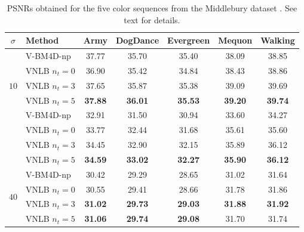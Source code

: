 \documentclass{llncs}
\newcommand{\best}[1]{\textbf{#1}}
\begin{document}
\begin{table}[htp!]
	\begin{center}
	\renewcommand{\tabcolsep}{2mm}
	\renewcommand{\arraystretch}{1.0}
	\begin{tabular}{ c | l |c c c c c}
		\hline
		\rule{0pt}{12pt}$\sigma$ & Method     & Army & DogDance & Evergreen & Mequon & Walking  \\\hline
		\multirow{5}{*}{$10$} & V-BM4D-np      &       37.77  &       35.70  &       35.40  &       38.09  &       38.85  \\
		                      & VNLB $n_t = 0$ &       36.90  &       35.42  &       34.84  &       38.43  &       38.86  \\
		                      & VNLB $n_t = 3$ &       37.65  &       35.87  &       35.38  &       39.09  &       39.69  \\
									 & VNLB $n_t = 5$ & \best{37.88} & \best{36.01} & \best{35.53} & \best{39.20} & \best{39.74} \\\hline
%									                                                                                           
		\multirow{5}{*}{$20$} & V-BM4D-np      &       32.91  &       31.50  &       30.94  &       33.60  &       34.27  \\
		                      & VNLB $n_t = 0$ &       33.77  &       32.44  &       31.68  &       35.61  &       35.60  \\
									 & VNLB $n_t = 3$ &       34.45  &       32.90  &       32.15  &       35.89  &       36.12  \\
									 & VNLB $n_t = 5$ & \best{34.59} & \best{33.02} & \best{32.27} & \best{35.90} & \best{36.12} \\\hline
%									                                                                                           
		\multirow{5}{*}{$40$} & V-BM4D-np      &       30.42  &       29.29  &       28.65  &       31.02  &       31.64  \\
		                      & VNLB $n_t = 0$ &       30.55  &       29.41  &       28.66  &       31.78  &       31.86  \\
									 & VNLB $n_t = 3$ & \best{31.02} & \best{29.73} & \best{29.03} & \best{31.88} & \best{31.92} \\
									 & VNLB $n_t = 5$ & \best{31.06} & \best{29.74} & \best{29.08} &       31.70  &       31.74  \\\hline
	\end{tabular}
	\end{center}
	\caption{PSNRs obtained for the five color sequences from the Middlebury
	dataset \cite{middleburyOflow}. See text for details.}
	\label{tab:psnr-middlebury}
\end{table}
\end{document}
